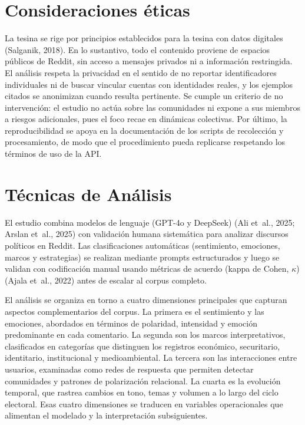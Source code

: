 \documentclass[
  letterpaper,
  numbers=noendperiod,
  fontsize=11pt,
  DIV=12,
  titlepage=false]{scrreprt}
\begin{document}
\section{Consideraciones éticas}\label{consideraciones-uxe9ticas}

La tesina se rige por principios establecidos para la tesina con datos
digitales (Salganik, 2018). En lo sustantivo, todo el contenido proviene
de espacios públicos de Reddit, sin acceso a mensajes privados ni a
información restringida. El análisis respeta la privacidad en el sentido
de no reportar identificadores individuales ni de buscar vincular
cuentas con identidades reales, y los ejemplos citados se anonimizan
cuando resulta pertinente. Se cumple un criterio de no intervención: el
estudio no actúa sobre las comunidades ni expone a sus miembros a
riesgos adicionales, pues el foco recae en dinámicas colectivas. Por
último, la reproducibilidad se apoya en la documentación de los scripts
de recolección y procesamiento, de modo que el procedimiento pueda
replicarse respetando los términos de uso de la API.

\section{Técnicas de Análisis}\label{tuxe9cnicas-de-anuxe1lisis}

El estudio combina modelos de lenguaje (GPT-4o y DeepSeek) (Ali et~al.,
2025; Arslan et~al., 2025) con validación humana sistemática para
analizar discursos políticos en Reddit. Las clasificaciones automáticas
(sentimiento, emociones, marcos y estrategias) se realizan mediante
prompts estructurados y luego se validan con codificación manual usando
métricas de acuerdo (kappa de Cohen, \(\kappa\)) (Ajala et~al., 2022)
antes de escalar al corpus completo.

El análisis se organiza en torno a cuatro dimensiones principales que
capturan aspectos complementarios del corpus. La primera es el
sentimiento y las emociones, abordados en términos de polaridad,
intensidad y emoción predominante en cada comentario. La segunda son los
marcos interpretativos, clasificados en categorías que distinguen los
registros económico, securitario, identitario, institucional y
medioambiental. La tercera son las interacciones entre usuarios,
examinadas como redes de respuesta que permiten detectar comunidades y
patrones de polarización relacional. La cuarta es la evolución temporal,
que rastrea cambios en tono, temas y volumen a lo largo del ciclo
electoral. Esas cuatro dimensiones se traducen en variables
operacionales que alimentan el modelado y la interpretación
subsiguientes.
\end{document}
